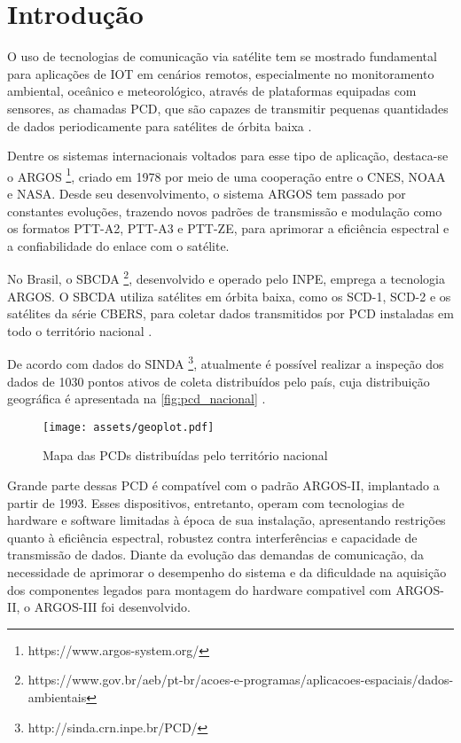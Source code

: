 \chapter{Introdução}\label{cap:introducao}

O uso de tecnologias de comunicação via satélite tem se mostrado fundamental para aplicações de \gls{IOT} em cenários remotos, especialmente no monitoramento ambiental, oceânico e meteorológico, através de plataformas equipadas com sensores, as chamadas \gls{PCD}, que são capazes de transmitir pequenas quantidades de dados periodicamente para satélites de órbita baixa \cite{Centenaro-2021, fraire_direct--satellite_2019}.

Dentre os sistemas internacionais voltados para esse tipo de aplicação, destaca-se o \gls{ARGOS} \footnote{https://www.argos-system.org/}, criado em 1978 por meio de uma cooperação entre o \gls{CNES}, \gls{NOAA} e \gls{NASA}. Desde seu desenvolvimento, o sistema \gls{ARGOS} tem passado por constantes evoluções, trazendo novos padrões de transmissão e modulação como os formatos \gls{PTT-A2}, \gls{PTT-A3} e \gls{PTT-ZE}, para aprimorar a eficiência espectral e a confiabilidade do enlace com o satélite. 

No Brasil, o \gls{SBCDA} \footnote{https://www.gov.br/aeb/pt-br/acoes-e-programas/aplicacoes-espaciais/dados-ambientais}, desenvolvido e operado pelo \gls{INPE}, emprega a tecnologia \gls{ARGOS}. O \gls{SBCDA} utiliza satélites em órbita baixa, como os \gls{SCD-1}, \gls{SCD-2} e os satélites da série \gls{CBERS}, para coletar dados transmitidos por \gls{PCD} instaladas em todo o território nacional \cite{rodrigues_demodulador_2018, duarte_multiuser_2021}. 

De acordo com dados do \gls{SINDA} \footnote{http://sinda.crn.inpe.br/PCD/}, atualmente é possível realizar a inspeção dos dados de 1030 pontos ativos de coleta distribuídos pelo país, cuja distribuição geográfica é apresentada na \autoref{fig:pcd_nacional} \cite{silva_um_2022}. 

\newpage
\begin{figure}[ht]
	\centering
	\caption{Mapa das PCDs distribuídas pelo território nacional}\label{fig:pcd_nacional}
	\texttt{[image: assets/geoplot.pdf]}
\end{figure}


Grande parte dessas \gls{PCD} é compatível com o padrão \gls{ARGOS-II}, implantado a partir de 1993. Esses dispositivos, entretanto, operam com tecnologias de hardware e software limitadas à época de sua instalação, apresentando restrições quanto à eficiência espectral, robustez contra interferências e capacidade de transmissão de dados. Diante da evolução das demandas de comunicação, da necessidade de aprimorar o desempenho do sistema e da dificuldade na aquisição dos componentes legados para montagem do hardware compativel com \gls{ARGOS-II}, o \gls{ARGOS-III} foi desenvolvido.

